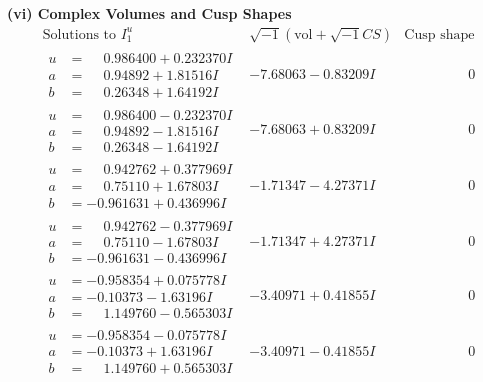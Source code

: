 \documentclass[1p]{elsarticle_modified}
\theoremstyle{definition}
\newcommand{\I}{\sqrt{-1}}
\begin{document}
\newpage\flushleft \textbf{(vi) Complex Volumes and Cusp Shapes}
$$\begin{array}{c|c|c}  
\text{Solutions to }I^u_{1}& \I (\text{vol} + \sqrt{-1}CS) & \text{Cusp shape}\\
 \hline 
\begin{aligned}
u &= \phantom{-}0.986400 + 0.232370 I \\
a &= \phantom{-}0.94892 + 1.81516 I \\
b &= \phantom{-}0.26348 + 1.64192 I\end{aligned}
 & -7.68063 - 0.83209 I & \phantom{-0.000000 } 0 \\ \hline\begin{aligned}
u &= \phantom{-}0.986400 - 0.232370 I \\
a &= \phantom{-}0.94892 - 1.81516 I \\
b &= \phantom{-}0.26348 - 1.64192 I\end{aligned}
 & -7.68063 + 0.83209 I & \phantom{-0.000000 } 0 \\ \hline\begin{aligned}
u &= \phantom{-}0.942762 + 0.377969 I \\
a &= \phantom{-}0.75110 + 1.67803 I \\
b &= -0.961631 + 0.436996 I\end{aligned}
 & -1.71347 - 4.27371 I & \phantom{-0.000000 } 0 \\ \hline\begin{aligned}
u &= \phantom{-}0.942762 - 0.377969 I \\
a &= \phantom{-}0.75110 - 1.67803 I \\
b &= -0.961631 - 0.436996 I\end{aligned}
 & -1.71347 + 4.27371 I & \phantom{-0.000000 } 0 \\ \hline\begin{aligned}
u &= -0.958354 + 0.075778 I \\
a &= -0.10373 - 1.63196 I \\
b &= \phantom{-}1.149760 - 0.565303 I\end{aligned}
 & -3.40971 + 0.41855 I & \phantom{-0.000000 } 0 \\ \hline\begin{aligned}
u &= -0.958354 - 0.075778 I \\
a &= -0.10373 + 1.63196 I \\
b &= \phantom{-}1.149760 + 0.565303 I\end{aligned}
 & -3.40971 - 0.41855 I & \phantom{-0.000000 } 0 \\ \hline\begin{aligned}

\end{aligned}
\end{array}$$
\end{document}
